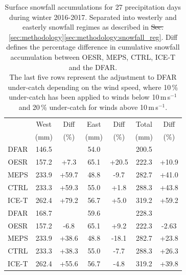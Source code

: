 \documentclass{ametsocV5}
\providecommand{\DIFadd}[1]{{\protect\color{blue}\uwave{#1}}} %
\providecommand{\DIFdel}[1]{{\protect\color{red}\sout{#1}}}                      %
\providecommand{\DIFaddFL}[1]{\DIFadd{#1}} %
\providecommand{\DIFdelFL}[1]{\DIFdel{#1}} %
\providecommand{\DIFaddbeginFL}{} %
\providecommand{\DIFaddendFL}{} %
\providecommand{\DIFdelbeginFL}{} %
\providecommand{\DIFdelendFL}{} %
\newcommand{\DIFscaledelfig}{0.5}
\newlength{\DIFdelgraphicswidth} %
\newlength{\DIFdelgraphicsheight} %
\newcommand{\DIFaddincludegraphics}[2][]{{\color{blue}\fbox{\DIFOincludegraphics[#1]{#2}}}} %
\newcommand{\DIFdelincludegraphics}[2][]{%
\sbox{\DIFdelgraphicsbox}{\DIFOincludegraphics[#1]{#2}}%
\settoboxwidth{\DIFdelgraphicswidth}{\DIFdelgraphicsbox} %
\settoboxtotalheight{\DIFdelgraphicsheight}{\DIFdelgraphicsbox} %
\scalebox{\DIFscaledelfig}{%
\parbox[b]{\DIFdelgraphicswidth}{\usebox{\DIFdelgraphicsbox}\\[-\baselineskip] \rule{\DIFdelgraphicswidth}{0em}}\llap{\resizebox{\DIFdelgraphicswidth}{\DIFdelgraphicsheight}{%
\setlength{\unitlength}{\DIFdelgraphicswidth}%
\begin{picture}(1,1)%
\thicklines\linethickness{2pt} %
{\color[rgb]{1,0,0}\put(0,0){\framebox(1,1){}}}%
{\color[rgb]{1,0,0}\put(0,0){\line( 1,1){1}}}%
{\color[rgb]{1,0,0}\put(0,1){\line(1,-1){1}}}%
\end{picture}%
}\hspace*{3pt}}} %
} %
\DeclareRobustCommand{\DIFaddbeginFL}{\DIFOaddbeginFL \let\includegraphics\DIFaddincludegraphics} %
\DeclareRobustCommand{\DIFaddendFL}{\DIFOaddendFL \let\includegraphics\DIFOincludegraphics} %
\DeclareRobustCommand{\DIFdelbeginFL}{\DIFOdelbeginFL \let\includegraphics\DIFdelincludegraphics} %
\DeclareRobustCommand{\DIFdelendFL}{\DIFOaddendFL \let\includegraphics\DIFOincludegraphics} %
\begin{document}
\begin{table}[t]
	\caption{
		Surface snowfall accumulations for 27 precipitation days during winter 2016-2017. Separated into westerly and easterly snowfall regimes as described in \DIFdelbeginFL \DIFdelFL{Sec. }\DIFdelendFL \DIFaddbeginFL \DIFaddFL{Section }\DIFaddendFL \ref{sec:methodology}\ref{sec:methodology:snowfall_reg}. Diff defines the percentage difference in cumulative snowfall accumulation between OESR, MEPS, CTRL, ICE-T and the DFAR.\\
		The last five rows represent the adjustment to DFAR under-catch depending on the wind speed, where 10\,\% under-catch has been applied to winds below 10\,m\,s$^{-1}$ and 20\,\% under-catch for winds above 10\,m\,s$^{-1}$.
	}
	\label{tab:sfc_acc}
	\begin{center}
		\begin{tabular}{c||c|c|c|c|c|c}\hline\hline
			& West & Diff & East & Diff & Total & Diff  \\
			& (mm) & (\%) & (mm) & (\%) & (mm)  & (\%)   \\\hline\hline
			DFAR & 146.5 & & 54.0 & & 200.5 & \\\hline
			OESR & 157.2 & +7.3 & 65.1 & +20.5 & 222.3 & +10.9  \\\hline
			MEPS & 233.9 & +59.7 & 48.8 & -9.7 & 282.7 & +41.0  \\\hline
			CTRL & 233.3 & +59.3 & 55.0 & +1.8 & 288.3 & +43.8  \\\hline
			ICE-T & 262.4 & +79.2 & 56.7 & +5.0 & 319.2 & +59.2  \\\hline\hline
			DFAR & 168.7 & & 59.6 & & 228.3 & \\\hline
			OESR & 157.2 & -6.8 & 65.1 & +9.2 & 222.3 & -2.63  \\\hline
			MEPS & 233.9 & +38.6 & 48.8 & -18.1 & 282.7 & +23.8  \\\hline
			CTRL & 233.3 & +38.3 & 55.0 & -7.7 & 288.3 & +26.3  \\\hline
			ICE-T & 262.4 & +55.6 & 56.7 & -4.8 & 319.2 & +39.8  \\\hline 

		\end{tabular}
	\end{center}
\end{table}




\end{document}
